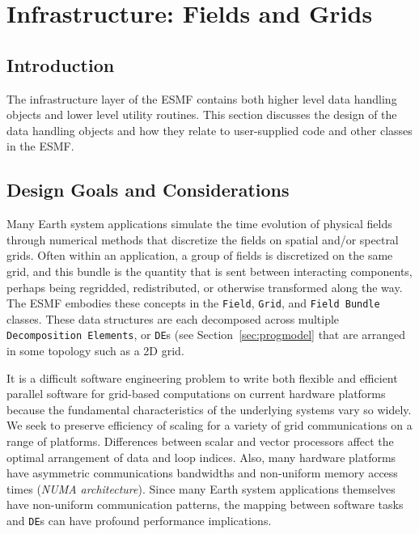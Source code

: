 \section{Infrastructure: Fields and Grids}
\label{sec:fieldclasses}

\subsection{Introduction}

The infrastructure layer of the ESMF contains both 
higher level data handling objects and lower level utility routines.
This section discusses the design of the data handling objects and 
how they relate to user-supplied code and other classes in the ESMF.  

\subsection{Design Goals and Considerations}

Many Earth system applications simulate the time evolution of physical 
fields through numerical methods that discretize the fields on spatial 
and/or spectral grids.  Often
within an application, a group of fields is discretized on the
same grid, and this bundle is the quantity that is sent between 
interacting components, perhaps being regridded, redistributed, or 
otherwise transformed along the way.  The ESMF embodies these concepts 
in the {\tt Field}, {\tt Grid}, and {\tt Field Bundle} classes.
These data structures are each decomposed across multiple {\tt Decomposition
Elements}, or {\tt DE}s (see Section~\ref{sec:progmodel} that are arranged 
in some topology such as a 2D grid.

It is a difficult software engineering problem to write both flexible 
and efficient parallel software for grid-based computations on current 
hardware platforms because the fundamental characteristics of the underlying
systems vary so widely.  We seek to preserve efficiency of scaling
for a variety of grid communications on a range of platforms.  
Differences between scalar and vector processors affect 
the optimal arrangement of data and loop indices.  Also, many hardware 
platforms have asymmetric communications bandwidths and 
non-uniform memory access times ({\it NUMA architecture}).
Since many Earth system applications themselves have non-uniform 
communication patterns, the mapping between software tasks and 
{\tt DE}s can have profound performance implications.  

